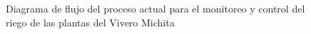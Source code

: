 \begin{figure}[h]
    \centering
    \caption{Diagrama de flujo del proceso actual para el monitoreo y control del riego de las plantas del Vivero Michita}\label{fig:proceso_actual}
\end{figure}